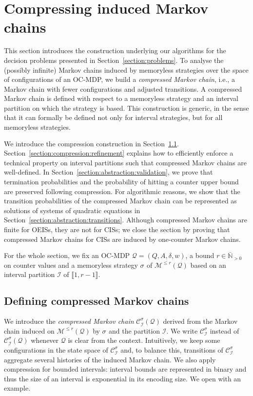\documentclass[a4paper,UKenglish,cleveref,autoref,thm-restate,colorlinks]{lipics-v2021}
\newcommand{\integerInterval}[1]{\llbracket{}#1\rrbracket{}}
\newcommand{\IN}{\mathbb{N}}
\newcommand{\INposBar}{\bar{\IN}_{>0}}
\newcommand{\mdp}{\mathcal{M}}
\newcommand{\weight}{w}
\newcommand{\ocmdp}{\mathcal{Q}}
\newcommand{\ocmdpFin}[2]{\mdp^{\leq #2}(#1)}
\newcommand{\ocStateSpace}{Q}
\newcommand{\ocActionSpace}{A}
\newcommand{\ocTrans}{\delta}
\newcommand{\ocTuple}{(\ocStateSpace, \ocActionSpace, \ocTrans, \weight)}
\newcommand{\counterUB}{r}
\newcommand{\mchain}{\mathcal{C}}
\newcommand{\intPart}{\mathcal{I}}
\newcommand{\compressChainStrat}[1]{\mchain^{#1}_{\intPart}}
\newcommand{\compressChain}{\compressChainStrat{\strat}}
\newcommand{\compressChainVerbose}{\mchain^{\strat}_{\intPart}(\ocmdp)}
\newcommand{\stratGeneric}[1]{{\sigma_{#1}}}
\newcommand{\strat}{\stratGeneric{}}
\begin{document}
 
\section{Compressing induced Markov chains}\label{section:abstraction}
This section introduces the construction underlying our algorithms for the decision problems presented in Section~\ref{section:problems}.
To analyse the (possibly infinite) Markov chains induced by memoryless strategies over the space of configurations of an OC-MDP, we build a \textit{compressed Markov chain}, i.e., a Markov chain with fewer configurations and adjusted transitions.
A compressed Markov chain is defined with respect to a memoryless strategy and an interval partition on which the strategy is based.
This construction is generic, in the sense that it can formally be defined not only for interval strategies, but for all memoryless strategies.

We introduce the compression construction in Section~\ref{section:abstraction:definition}.
Section~\ref{section:compression:refinement} explains how to efficiently enforce a technical property on interval partitions such that compressed Markov chains are well-defined.
In Section~\ref{section:abstraction:validation}, we prove that termination probabilities and the probability of hitting a counter upper bound are preserved following compression.
For algorithmic reasons, we show that the transition probabilities of the compressed Markov chain can be represented as solutions of systems of quadratic equations in Section~\ref{section:abstraction:transitions}.
Although compressed Markov chains are finite for OEISs, they are not for CISs; we close the section by proving that compressed Markov chains for CISs are induced by one-counter Markov chains.


For the whole section, we fix an OC-MDP $\ocmdp = \ocTuple$, a bound $\counterUB\in\INposBar$ on counter values and a memoryless strategy $\strat$ of $\ocmdpFin{\ocmdp}{\counterUB}$ based on an interval partition $\intPart$ of $\integerInterval{1,\counterUB-1}$.

\subsection{Defining compressed Markov chains}\label{section:abstraction:definition}
We introduce the \textit{compressed Markov chain} $\compressChainVerbose$ derived from the Markov chain induced on $\ocmdpFin{\ocmdp}{\counterUB}$ by $\strat$ and the partition $\intPart$.
We write $\compressChain$ instead of $\compressChainVerbose$ whenever $\ocmdp$ is clear from the context. Intuitively, we keep some configurations in the state space of $\compressChain$ and, to balance this, transitions of $\compressChain$ aggregate several histories of the induced Markov chain.
We also apply compression for bounded intervals: interval bounds are represented in binary and thus the size of an interval is exponential in its encoding size.
We open with an example.
\end{document}
